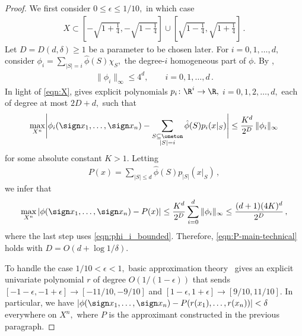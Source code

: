 \begin{proof}
We first consider $0\leq\epsilon\leq1/10,$ in which
case 
\begin{align}
X\subset\left[-\sqrt{1+\frac14},-\sqrt{1-\frac14}\right]\cup
\left[\sqrt{1-\frac14},\sqrt{1+\frac14}\right]\,.
\label{eqn:X}
\end{align}
Let $D=D(d,\delta)\geq1$ be a parameter to be chosen later.
For $i=0,1,\dots,d,$ consider 
$\phi_i=\sum_{|S|=i}\hat\phi(S)\chi_S,$ the
degree-$i$ homogeneous part of $\phi$.
By ,
\begin{align}
\label{eqn:phi_i_bounded}
\|\phi_i\|_\infty \leq 4^d, \qquad
i=0,1,\dots,d\,.
\end{align}
In light of \eqref{eqn:X},  gives explicit
polynomials $p_i\colon\R^i\to\R,$
$i=0,1,2,\dots,d,$ each of degree at most $2D+d,$ such
that
\begin{align*}
\max_{X^n}\Biggl|\phi_i(\sign x_1,\dots,\sign x_n)
 - \sum_{\substack{S\subseteq\oneton\\|S|=i}}\hat\phi(S)p_i(x|_S)
 \Biggr| \leq
\frac{K^d}{2^D} \, \|\phi_i\|_\infty
\end{align*}
for some absolute constant $K>1$. 
Letting 
\begin{align*}
P(x) = \sum_{|S|\leq d}\hat\phi(S)p_{|S|}(x|_S)\,, 
\end{align*}
we infer that 
\begin{align*}
\max_{X^n}\left|\phi(\sign x_1,\dots,\sign x_n)
 - P(x)\right|
\leq
\frac{K^d}{2^D} \sum_{i=0}^d\|\phi_i\|_\infty
\leq 
\frac{(d+1)(4K)^d}{2^D}\,,
\end{align*}
where the last step uses \eqref{eqn:phi_i_bounded}.
Therefore, \eqref{eqn:P-main-technical} holds with 
$D=O(d+\log 1/\delta)$. 

To handle the case $1/10<\epsilon<1,$ basic approximation
theory~\cite{rivlin-book} gives an explicit univariate
polynomial $r$ of degree $O(1/{(1-\epsilon)})$ that sends
$[-1-\epsilon,-1+\epsilon]\to[-11/10,-9/10]$ and 
$[1-\epsilon,1+\epsilon]\to[9/10,11/10]$. In particular, we have
$\left|\phi(\sign x_1,\dots,\sign
x_n)-P(r(x_1),\dots,r(x_n))\right|<\delta$ everywhere
on $X^n,$ where $P$ is the approximant constructed in the
previous paragraph.
\end{proof}
